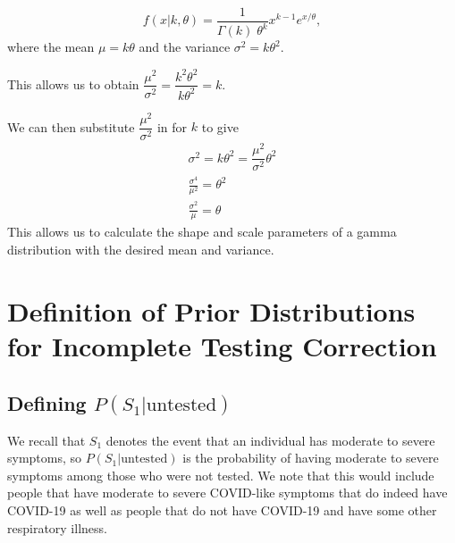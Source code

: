\documentclass[12pt,twoside]{smiththesis}
\begin{document}
\[f(x|k,\theta) = \frac{1}{\Gamma(k) \;\theta^k}x^{k-1} e^{x/\theta},\]
where the mean \(\mu =k\theta\) and the variance \(\sigma^2 = k\theta^2\).

This allows us to obtain \(\dfrac{\mu^2}{\sigma^2} = \dfrac{k^2 \theta^2}{k\theta^2} = k\).

We can then substitute \(\dfrac{\mu^2}{\sigma^2}\) in for \(k\) to give
\begin{align*}
\sigma^2 = k \theta^2 = \dfrac{\mu^2}{\sigma^2} \theta^2\\
\frac{\sigma^4}{\mu^2}=\theta^2\\
\frac{\sigma^2}{\mu}=\theta
\end{align*}
This allows us to calculate the shape and scale parameters of a gamma distribution with the desired mean and variance.

\newpage

\hypertarget{definition-of-prior-distributions-for-incomplete-testing-correction}{%
\section{Definition of Prior Distributions for Incomplete Testing Correction}\label{definition-of-prior-distributions-for-incomplete-testing-correction}}

\hypertarget{defining-ps_1textuntested}{%
\subsection{\texorpdfstring{Defining \(P(S_1|\text{untested})\)}{Defining P(S\_1\textbar\textbackslash text\{untested\})}}\label{defining-ps_1textuntested}}

We recall that \(S_1\) denotes the event that an individual has moderate to severe symptoms, so
\(P(S_1|\text{untested})\) is the probability of having moderate to severe symptoms among those who were not tested. We note that this would include people that have moderate to severe COVID-like symptoms that do indeed have COVID-19 as well as people that do not have COVID-19 and have some other respiratory illness.
\end{document}
